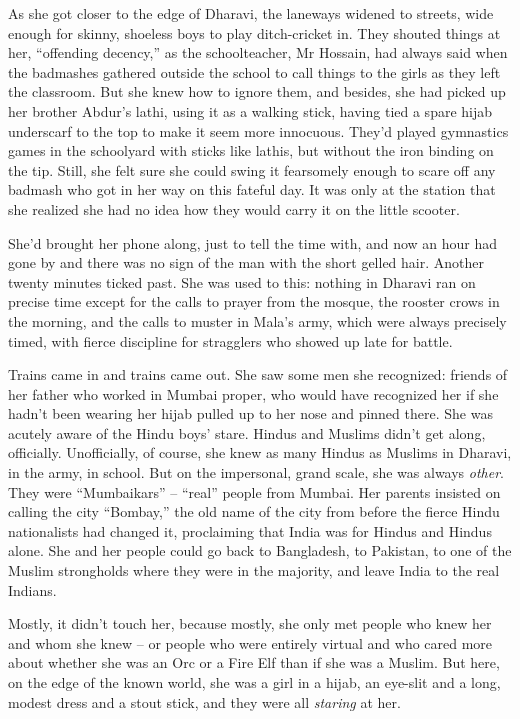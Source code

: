 As she got closer to the edge of Dharavi, the laneways widened to
streets, wide enough for skinny, shoeless boys to play
ditch-cricket in. They shouted things at her, ``offending decency,''
as the schoolteacher, Mr Hossain, had always said when the
badmashes gathered outside the school to call things to the girls
as they left the classroom. But she knew how to ignore them, and
besides, she had picked up her brother Abdur's lathi, using it as a
walking stick, having tied a spare hijab underscarf to the top to
make it seem more innocuous. They'd played gymnastics games in the
schoolyard with sticks like lathis, but without the iron binding on
the tip. Still, she felt sure she could swing it fearsomely enough
to scare off any badmash who got in her way on this fateful day. It
was only at the station that she realized she had no idea how they
would carry it on the little scooter.

She'd brought her phone along, just to tell the time with, and now
an hour had gone by and there was no sign of the man with the short
gelled hair. Another twenty minutes ticked past. She was used to
this: nothing in Dharavi ran on precise time except for the calls
to prayer from the mosque, the rooster crows in the morning, and
the calls to muster in Mala's army, which were always precisely
timed, with fierce discipline for stragglers who showed up late for
battle.

Trains came in and trains came out. She saw some men she
recognized: friends of her father who worked in Mumbai proper, who
would have recognized her if she hadn't been wearing her hijab
pulled up to her nose and pinned there. She was acutely aware of
the Hindu boys' stare. Hindus and Muslims didn't get along,
officially. Unofficially, of course, she knew as many Hindus as
Muslims in Dharavi, in the army, in school. But on the impersonal,
grand scale, she was always \emph{other}. They were ``Mumbaikars'' --
``real'' people from Mumbai. Her parents insisted on calling the city
``Bombay,'' the old name of the city from before the fierce Hindu
nationalists had changed it, proclaiming that India was for Hindus
and Hindus alone. She and her people could go back to Bangladesh,
to Pakistan, to one of the Muslim strongholds where they were in
the majority, and leave India to the real Indians.

Mostly, it didn't touch her, because mostly, she only met people
who knew her and whom she knew -- or people who were entirely
virtual and who cared more about whether she was an Orc or a Fire
Elf than if she was a Muslim. But here, on the edge of the known
world, she was a girl in a hijab, an eye-slit and a long, modest
dress and a stout stick, and they were all \emph{staring} at her.

